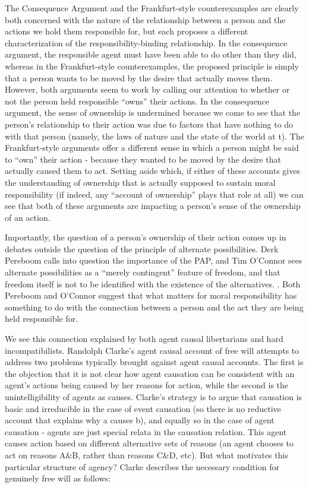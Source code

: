 \documentclass[phd,12pt,oneside,paper=letterpaper]{ubcthesis}
\begin{document}
The Consequence Argument and the Frankfurt-style counterexamples are clearly both concerned with the nature of the relationship between a person and the actions we hold them responsible for, but each proposes a different characterization of the responsibility-binding relationship. In the consequence argument, the responsible agent must have been able to do other than they did, whereas in the Frankfurt-style counterexamples, the proposed principle is simply that a person wants to be moved by the desire that actually moves them. However, both arguments seem to work by calling our attention to whether or not the person held responsible ``owns'' their actions. In the consequence argument, the sense of ownership is undermined because we come to see that the person's relationship to their action was due to factors that have nothing to do with that person (namely, the laws of nature and the state of the world at t). The Frankfurt-style arguments offer a different sense in which a person might be said to ``own'' their action - because they wanted to be moved by the desire that actually caused them to act. Setting aside which, if either of these accounts gives the understanding of ownership that is actually supposed to sustain moral responsibility (if indeed, any ``account of ownership'' plays that role at all) we can see that both of these arguments are impacting a person's sense of the ownership of an action. 

Importantly, the question of a person's ownership of their action comes up in debates outside the question of the principle of alternate possibilities. Derk Pereboom \citeyearpar{pereboom2001} calls into question the importance of the PAP, and Tim O'Connor sees alternate possibilities as a ``merely contingent'' feature of freedom, and that freedom itself is not to be identified with the existence of the alternatives. \citep{oconnor2005}. Both Pereboom and O'Connor suggest that what matters for moral responsibility has something to do with the connection between a person and the act they are being held responsible for. 

We see this connection explained by both agent causal libertarians and hard incompatibilists. Randolph Clarke's agent causal account of free will attempts to address two problems typically brought against agent causal accounts. The first is the objection that it is not clear how agent causation can be consistent with an agent's actions being caused by her reasons for action, while the second is the unintelligibility of agents as causes. Clarke's strategy is to argue that causation is basic and irreducible in the case of event causation (so there is no reductive account that explains why a causes b), and equally so in the case of agent causation - agents are just special relata in the causation relation. This agent causes action based on different alternative sets of reasons (an agent chooses to act on reasons A\&B, rather than reasons C\&D, etc). \citep{clarke1993} But what motivates this particular structure of agency? Clarke describes the necessary condition for genuinely free will as follows:
\end{document}
